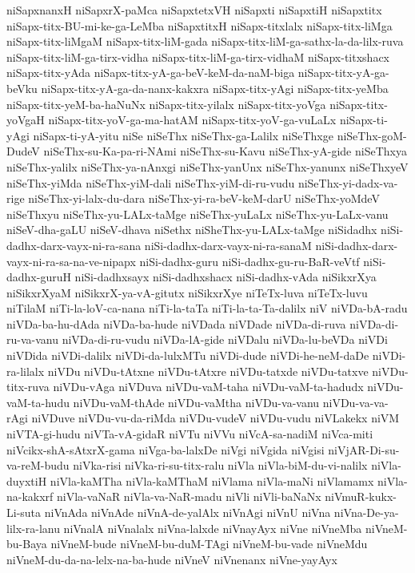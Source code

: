 {niSapxnanxH
niSapxrX-paMca
niSapxtetxVH
niSapxti
niSapxtiH
niSapxtitx
niSapx-titx-BU-mi-ke-ga-LeMba
niSapxtitxH
niSapx-titxlalx
niSapx-titx-liMga
niSapx-titx-liMgaM
niSapx-titx-liM-gada
niSapx-titx-liM-ga-sathx-la-da-lilx-ruva
niSapx-titx-liM-ga-tirx-vidha
niSapx-titx-liM-ga-tirx-vidhaM
niSapx-titxshacx
niSapx-titx-yAda
niSapx-titx-yA-ga-beV-keM-da-naM-biga
niSapx-titx-yA-ga-beVku
niSapx-titx-yA-ga-da-nanx-kakxra
niSapx-titx-yAgi
niSapx-titx-yeMba
niSapx-titx-yeM-ba-haNuNx
niSapx-titx-yilalx
niSapx-titx-yoVga
niSapx-titx-yoVgaH
niSapx-titx-yoV-ga-ma-hatAM
niSapx-titx-yoV-ga-vuLaLx
niSapx-ti-yAgi
niSapx-ti-yA-yitu
niSe
niSeThx
niSeThx-ga-Lalilx
niSeThxge
niSeThx-goM-DudeV
niSeThx-su-Ka-pa-ri-NAmi
niSeThx-su-Kavu
niSeThx-yA-gide
niSeThxya
niSeThx-yalilx
niSeThx-ya-nAnxgi
niSeThx-yanUnx
niSeThx-yanunx
niSeThxyeV
niSeThx-yiMda
niSeThx-yiM-dali
niSeThx-yiM-di-ru-vudu
niSeThx-yi-dadx-va-rige
niSeThx-yi-lalx-du-dara
niSeThx-yi-ra-beV-keM-darU
niSeThx-yoMdeV
niSeThxyu
niSeThx-yu-LALx-taMge
niSeThx-yuLaLx
niSeThx-yu-LaLx-vanu
niSeV-dha-gaLU
niSeV-dhava
niSethx
niSheThx-yu-LALx-taMge
niSidadhx
niSi-dadhx-darx-vayx-ni-ra-sana
niSi-dadhx-darx-vayx-ni-ra-sanaM
niSi-dadhx-darx-vayx-ni-ra-sa-na-ve-nipapx
niSi-dadhx-guru
niSi-dadhx-gu-ru-BaR-veVtf
niSi-dadhx-guruH
niSi-dadhxsayx
niSi-dadhxshacx
niSi-dadhx-vAda
niSikxrXya
niSikxrXyaM
niSikxrX-ya-vA-gitutx
niSikxrXye
niTeTx-luva
niTeTx-luvu
niTilaM
niTi-la-loV-ca-nana
niTi-la-taTa
niTi-la-ta-Ta-dalilx
niV
niVDa-bA-radu
niVDa-ba-hu-dAda
niVDa-ba-hude
niVDada
niVDade
niVDa-di-ruva
niVDa-di-ru-va-vanu
niVDa-di-ru-vudu
niVDa-lA-gide
niVDalu
niVDa-lu-beVDa
niVDi
niVDida
niVDi-dalilx
niVDi-da-lulxMTu
niVDi-dude
niVDi-he-neM-daDe
niVDi-ra-lilalx
niVDu
niVDu-tAtxne
niVDu-tAtxre
niVDu-tatxde
niVDu-tatxve
niVDu-titx-ruva
niVDu-vAga
niVDuva
niVDu-vaM-taha
niVDu-vaM-ta-hadudx
niVDu-vaM-ta-hudu
niVDu-vaM-thAde
niVDu-vaMtha
niVDu-va-vanu
niVDu-va-va-rAgi
niVDuve
niVDu-vu-da-riMda
niVDu-vudeV
niVDu-vudu
niVLakekx
niVM
niVTA-gi-hudu
niVTa-vA-gidaR
niVTu
niVVu
niVcA-sa-nadiM
niVca-miti
niVcikx-shA-sAtxrX-gama
niVga-ba-lalxDe
niVgi
niVgida
niVgisi
niVjAR-Di-su-va-reM-budu
niVka-risi
niVka-ri-su-titx-ralu
niVla
niVla-biM-du-vi-nalilx
niVla-duyxtiH
niVla-kaMTha
niVla-kaMThaM
niVlama
niVla-maNi
niVlamamx
niVla-na-kakxrf
niVla-vaNaR
niVla-va-NaR-madu
niVli
niVli-baNaNx
niVmuR-kukx-Li-suta
niVnAda
niVnAde
niVnA-de-yalAlx
niVnAgi
niVnU
niVna
niVna-De-ya-lilx-ra-lanu
niVnalA
niVnalalx
niVna-lalxde
niVnayAyx
niVne
niVneMba
niVneM-bu-Baya
niVneM-bude
niVneM-bu-duM-TAgi
niVneM-bu-vade
niVneMdu
niVneM-du-da-na-lelx-na-ba-hude
niVneV
niVnenanx
niVne-yayAyx
}
